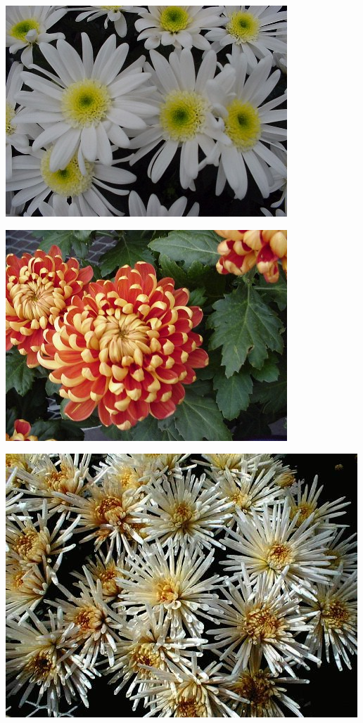 \documentclass{article}
\begin{document}
\begin{center}
\includegraphics[height=0.925\paperheight]{../Chrysanthemum_Mankato.jpg}
\end{center}
\newpage

\begin{center}
\includegraphics[height=0.925\paperheight]{../Chrysanthemum_PianoCopper.jpg}
\end{center}
\newpage

\begin{center}
\includegraphics[height=0.925\paperheight]{../Chrysanthemum_Quill.jpg}
\end{center}
\newpage
\end{document}

